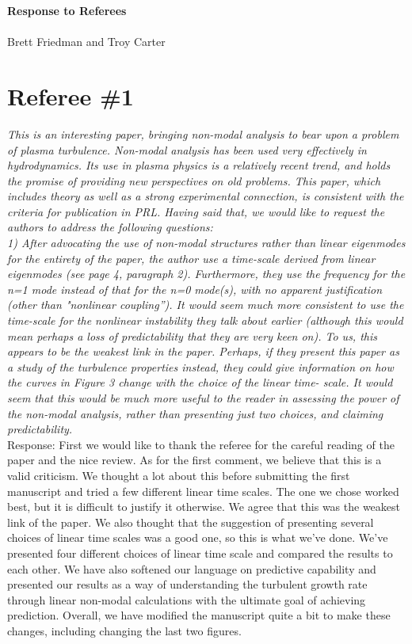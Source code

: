 \documentclass[12pt]{article}
\begin{document}
{\bf Response to Referees \\
 \\} 
Brett Friedman and Troy Carter

\hrulefill

\section{Referee \#1}

\emph{This is an interesting paper, bringing non-modal analysis to bear upon a problem of
plasma turbulence. Non-modal analysis has been used very effectively in hydrodynamics.
Its use in plasma physics is a relatively recent trend, and holds the promise of providing
new perspectives on old problems. This paper, which includes theory as well as a strong
experimental connection, is consistent with the criteria for publication in PRL. Having
said that, we would like to request the authors to address the following questions:} \\

\emph{1) After advocating the use of non-modal structures rather than linear eigenmodes for the
entirety of the paper, the author use a time-scale derived from linear eigenmodes (see
page 4, paragraph 2). Furthermore, they use the frequency for the n=1 mode instead of
that for the n=0 mode(s), with no apparent justification (other than "nonlinear coupling”).
It would seem much more consistent to use the time-scale for the nonlinear instability
they talk about earlier (although this would mean perhaps a loss of predictability that they
are very keen on). To us, this appears to be the weakest link in the paper. Perhaps, if they
present this paper as a study of the turbulence properties instead, they could give
information on how the curves in Figure 3 change with the choice of the linear time-
scale. It would seem that this would be much more useful to the reader in assessing the
power of the non-modal analysis, rather than presenting just two choices, and claiming
predictability. } \\

Response: First we would like to thank the referee for the careful reading of the paper and the nice review. As for the first comment, we believe that this is a valid criticism. 
We thought a lot about this before submitting the first manuscript and tried a few different linear time scales. The one we chose worked best, but it is difficult to justify it otherwise.
We agree that this was the weakest link of the paper. We also thought that the suggestion of presenting several choices of linear time scales was a good one, so this is what we've done.
We've presented four different choices of linear time scale and compared the results to each other. We have also softened our language on predictive capability and presented our results
as a way of understanding the turbulent growth rate through linear non-modal calculations with the ultimate goal of achieving prediction. Overall, we have modified the manuscript quite
a bit to make these changes, including changing the last two figures. \\
\end{document}
